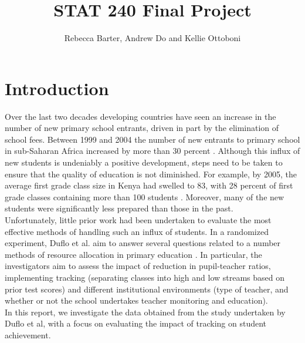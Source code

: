 \documentclass[11pt]{article}
\title{STAT 240 Final Project}
\author{Rebecca Barter, Andrew Do and Kellie Ottoboni}
\begin{document}
\maketitle

 \section{Introduction}
Over the last two decades developing countries have seen an increase in the number of new primary school entrants, driven in part by the elimination of school fees. Between 1999 and 2004 the number of new entrants to primary school in sub-Saharan Africa increased by more than 30 percent \cite{unesco2007}. Although this influx of new students is undeniably a positive development, steps need to be taken to ensure that the quality of education is not diminished. For example, by 2005, the average first grade class size in Kenya had swelled to 83, with 28 percent of first grade classes containing more than 100 students \cite{duflo2007}. Moreover, many of the new students were significantly less prepared than those in the past.\\

Unfortunately, little prior work had been undertaken to evaluate the most effective methods of handling such an influx of students. In a randomized experiment, Duflo et al. aim to answer several questions related to a number methods of resource allocation in primary education \cite{duflo2011}. In particular, the investigators aim to assess the impact of reduction in pupil-teacher ratios, implementing tracking (separating classes into high and low streams based on prior test scores) and different institutional environments (type of teacher, and whether or not the school undertakes teacher monitoring and education).\\

In this report, we investigate the data obtained from the study undertaken by Duflo et al, with a focus on evaluating the impact of tracking on student achievement. 
 
\end{document}
